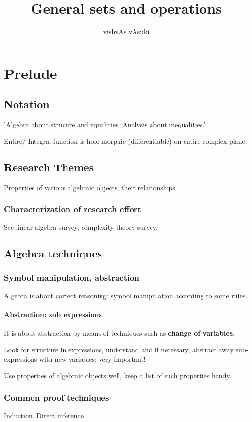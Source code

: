 \documentclass[oneside, article]{memoir}
\title{General sets and operations}
\author{vishvAs vAsuki}
\begin{document}
\maketitle
\tableofcontents

\part{Prelude}
\chapter{Notation}
'Algebra about strucure and equalities. Analysis about inequalities.'

Entire/ Integral function is holo morphic (differentiable) on entire complex plane.

\chapter{Research Themes}
Properties of various algebraic objects, their relationships.

\section{Characterization of research effort}
See linear algebra survey, complexity theory survey.

\chapter{Algebra techniques}
\section{Symbol manipulation, abstraction}
Algebra is about correct reasoning: symbol manipulation according to some rules.

\subsection{Abstraction: sub expressions}
It is about abstraction by means of techniques such as \textbf{change of variables}.

Look for structure in expressions, understand and if necessary, abstract away sub-expressions with new variables: very important! 

Use properties of algebraic objects well, keep a list of such properties handy.

\section{Common proof techniques}
Induction. Direct inference. 
\end{document}
